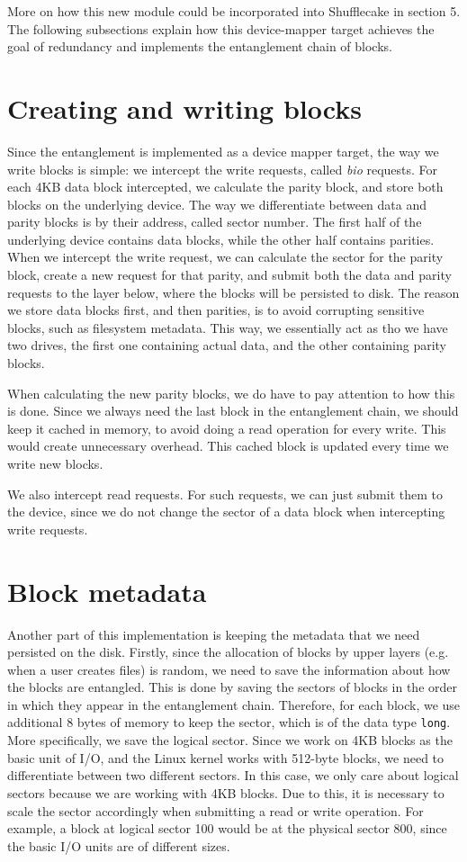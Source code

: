\documentclass[a4paper,11pt,oneside]{report}
\begin{document}
More on how this new module could be incorporated into Shufflecake in section 5. The following subsections explain how this device-mapper target achieves the goal of redundancy and implements the entanglement chain of blocks. 

\section{Creating and writing blocks}
Since the entanglement is implemented as a device mapper target, the way we write blocks is simple: we intercept the write requests, called \emph{bio} requests. For each 4KB data block intercepted, we calculate the parity block, and store both blocks on the underlying device. The way we differentiate between data and parity blocks is by their address, called sector number. The first half of the underlying device contains data blocks, while the other half contains parities. When we intercept the write request, we can calculate the sector for the parity block, create a new request for that parity, and submit both the data and parity requests to the layer below, where the blocks will be persisted to disk. The reason we store data blocks first, and then parities, is to avoid corrupting sensitive blocks, such as filesystem metadata. This way, we essentially act as tho we have two drives, the first one containing actual data, and the other containing parity blocks. 

When calculating the new parity blocks, we do have to pay attention to how this is done. Since we always need the last block in the entanglement chain, we should keep it cached in memory, to avoid doing a read operation for every write. This would create unnecessary overhead. This cached block is updated every time we write new blocks. 

We also intercept read requests. For such requests, we can just submit them to the device, since we do not change the sector of a data block when intercepting write requests. 

\section{Block metadata}
Another part of this implementation is keeping the metadata that we need persisted on the disk. Firstly, since the allocation of blocks by upper layers (e.g. when a user creates files) is random, we need to save the information about how the blocks are entangled. This is done by saving the sectors of blocks in the order in which they appear in the entanglement chain. Therefore, for each block, we use additional 8 bytes of memory to keep the sector, which is of the data type \texttt{long}. More specifically, we save the logical sector. Since we work on 4KB blocks as the basic unit of I/O, and the Linux kernel works with 512-byte blocks, we need to differentiate between two different sectors. In this case, we only care about logical sectors because we are working with 4KB blocks. Due to this, it is necessary to scale the sector accordingly when submitting a read or write operation. For example, a block at logical sector 100 would be at the physical sector 800, since the basic I/O units are of different sizes. 
\end{document}
